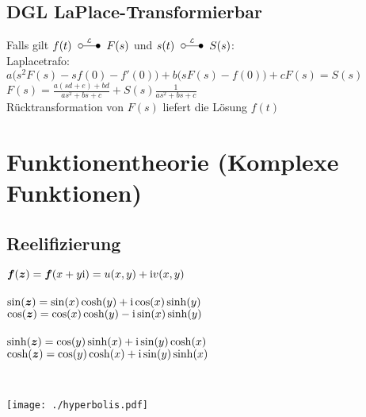 \documentclass[german,color,6pt]{latex4ei/latex4ei_fs}
\begin{document}
\begin{sectionbox}
	\subsection{DGL LaPlace-Transformierbar}
	Falls gilt $f(t) \LT F(s)$ und $s(t) \LT S(s)$: \\
	Laplacetrafo: $a\bigl(s^2 F(s) - sf(0) - f'(0)\bigr) + b\bigl( s F(s) - f(0) \bigr) + c F(s) = S(s)$\\
	$F(s) = \frac{a(sd + e) + bd}{as^2 + bs +c} + S(s) \frac{1}{as^2 + bs +c}$ \\
	Rücktransformation von $F(s)$ liefert die Lösung $f(t)$
\end{sectionbox}



\section{Funktionentheorie (Komplexe Funktionen)}
\begin{sectionbox}
	\subsection{Reelifizierung}
	\parbox{4.7cm}{
		$\boldsymbol{f}(\boldsymbol{z}) = \boldsymbol{f}(x+y \mathrm{i}) = u(x,y) + \mathrm{i} v(x,y)$\\
		\\
		$\sin(\boldsymbol{z}) = \sin(x)\cosh(y) + \mathrm{i} \cos(x)\sinh(y)$\\
		$\cos(\boldsymbol{z}) = \cos(x)\cosh(y) - \mathrm{i} \sin(x)\sinh(y)$\\
		\\
		$\sinh(\boldsymbol{z}) = \cos(y) \sinh(x) + \mathrm{i} \sin(y) \cosh(x)$\\
		$\cosh(\boldsymbol{z}) = \cos(y) \cosh(x) + \mathrm{i} \sin(y) \sinh(x)$ }\ 
	\parbox{2cm}{\texttt{[image: ./hyperbolis.pdf]} }
\end{sectionbox}
\end{document}
